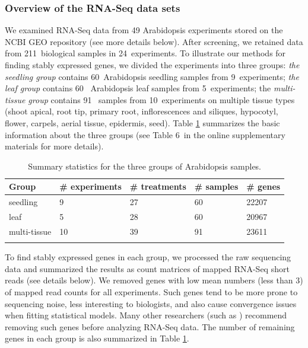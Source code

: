 \documentclass[letterpaper,12pt]{article}
\newcommand{\howmanySamples}{211~}
\newcommand{\howmanylab}{24~}
\newcommand{\howmanyseedlingsample}{60~}
\newcommand{\howmanyleafsample}{60~}
\newcommand{\howmanytissuesample}{91~}
\newcommand{\howmanyseedlingexperiment}{9~}
\newcommand{\howmanyleafexperiment}{5~}
\newcommand{\howmanytissueexperiment}{10~}
\newcommand{\supptableone}{6~}
\begin{document}
\subsubsection{Overview of the RNA-Seq data sets}
We examined RNA-Seq data from 49 Arabidopsis experiments stored on the NCBI
GEO repository (see more details below). After screening, we retained data
from \howmanySamples biological samples in \howmanylab experiments.  To illustrate our methods
for finding stably expressed genes, we divided the experiments into three
groups: \textit{the seedling group} contains \howmanyseedlingsample Arabidopsis seedling samples
from \howmanyseedlingexperiment experiments; \textit{ the leaf group} contains \howmanyleafsample 
Arabidopsis leaf
samples from \howmanyleafexperiment experiments;  the \textit{multi-tissue group} contains 
\howmanytissuesample
samples from \howmanytissueexperiment experiments on multiple tissue types (shoot apical, root tip,
primary root, inflorescences and siliques, hypocotyl, flower, carpels, aerial
tissue, epidermis, seed).  Table \ref{table:TableSet3} summarizes the basic information about
the three groups (see Table \supptableone in the online supplementary materials for more details).
\begin{table}[!ht]
	\centering
	\caption[Summary statistics for the three groups of Arabidopsis samples]{Summary statistics for 
		the three groups of Arabidopsis samples.}
	\begin{tabular}{lp{2.4cm}p{2.3cm}p{2cm}p{1.5cm}} \hline
		Group & \#  experiments & \# treatments  & \# samples & \# genes \\ \hline
		seedling &   9 &  27 &  60 & 22207 \\ 
		leaf &   5 &  28 &  60 & 20967 \\ 
		multi-tissue &  10 &  39 &  91 & 23611 \\ \hline
		\label{table:TableSet3}
	\end{tabular}
\end{table}

To find stably expressed genes in each group, we processed the raw
sequencing data and summarized the results as count matrices of mapped RNA-Seq
short reads (see details below).  We removed genes with low mean numbers (less
than 3) of mapped read counts for all experiments.  Such genes tend to be more prone to sequencing
noise, less interesting to biologists, and also cause convergence issues when
fitting statistical models. Many other researchers (such as \citealt{anders2013count})
recommend removing such genes before analyzing RNA-Seq data.  The number of
remaining genes in each group is also summarized in Table
\ref{table:TableSet3}.
\end{document}
